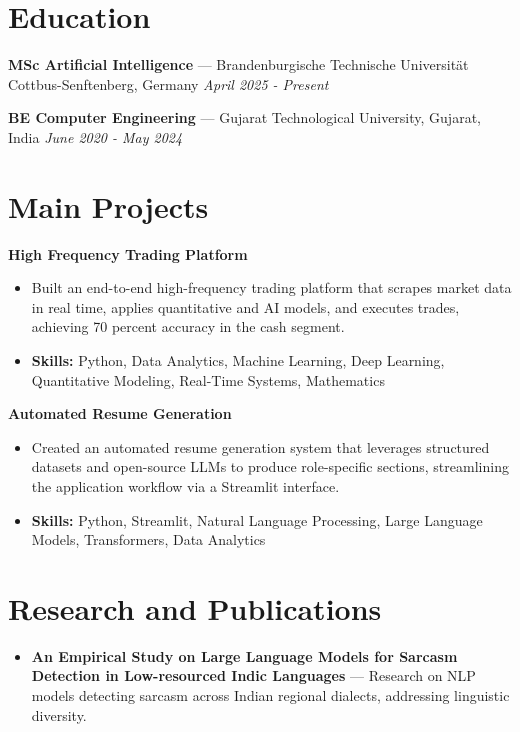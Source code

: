 \documentclass[a4paper,10pt]{article}
\begin{document}
\section*{Education}
\textbf{MSc Artificial Intelligence} — Brandenburgische Technische Universität Cottbus-Senftenberg, Germany \hfill \textit{April 2025 - Present}\par
\vspace{1.5pt}
\textbf{BE Computer Engineering} — Gujarat Technological University, Gujarat, India \hfill \textit{June 2020 - May 2024}\par

\section*{Main Projects}
\textbf{High Frequency Trading Platform}\par
\vspace{1pt}
\begin{itemize}
  \item Built an end-to-end high-frequency trading platform that scrapes market data in real time, applies quantitative and AI models, and executes trades, achieving 70 percent accuracy in the cash segment.
  \item \textbf{Skills:} Python, Data Analytics, Machine Learning, Deep Learning, Quantitative Modeling, Real-Time Systems, Mathematics
\end{itemize}
\vspace{3pt}
\textbf{Automated Resume Generation}\par
\vspace{1pt}
\begin{itemize}
  \item Created an automated resume generation system that leverages structured datasets and open-source LLMs to produce role-specific sections, streamlining the application workflow via a Streamlit interface.
  \item \textbf{Skills:} Python, Streamlit, Natural Language Processing, Large Language Models, Transformers, Data Analytics
\end{itemize}

\section*{Research and Publications}
\begin{itemize}
\item \textbf{An Empirical Study on Large Language Models for Sarcasm Detection in Low-resourced Indic Languages} — Research on NLP models detecting sarcasm across Indian regional dialects, addressing linguistic diversity.
\end{itemize}
\end{document}
